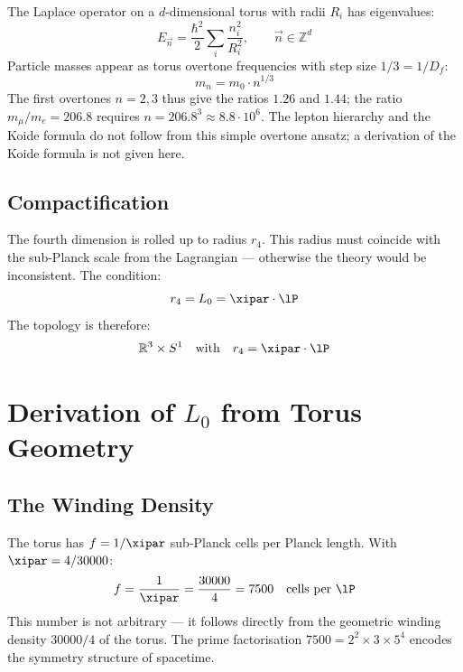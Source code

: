 The Laplace operator on a $d$-dimensional torus with radii $R_i$ has eigenvalues:
\begin{equation}
	E_{\vec{n}} = \frac{\hbar^2}{2} \sum_i \frac{n_i^2}{R_i^2}, \qquad \vec{n} \in \mathbb{Z}^d
\end{equation}
Particle masses appear as torus overtone frequencies with step size $1/3 = 1/D_f$:
\begin{equation}
	m_n = m_0 \cdot n^{1/3}
\end{equation}
The first overtones $n = 2, 3$ thus give the ratios $1.26$ and $1.44$; the ratio $m_\mu/m_e = 206.8$ requires $n = 206.8^3 \approx 8.8\cdot 10^6$. The lepton hierarchy and the Koide formula do not follow from this simple overtone ansatz; a derivation of the Koide formula is not given here.

\subsection{Compactification}

The fourth dimension is rolled up to radius $r_4$. This radius must coincide with the sub-Planck scale from the Lagrangian — otherwise the theory would be inconsistent. The condition:
\begin{equation}
	r_4 = L_0 = \xipar \cdot \lP
\end{equation}
The topology is therefore:
\begin{equation}
	\mathbb{R}^3 \times S^1 \quad \text{with} \quad r_4 = \xipar \cdot \lP
\end{equation}

\section{Derivation of \texorpdfstring{$L_0$}{L0} from Torus Geometry}

\subsection{The Winding Density}

The torus has $f = 1/\xipar$ sub-Planck cells per Planck length. With $\xipar = 4/30000$:
\begin{equation}
	f = \frac{1}{\xipar} = \frac{30000}{4} = 7500 \quad \text{cells per } \lP
\end{equation}
This number is not arbitrary — it follows directly from the geometric winding density $30000/4$ of the torus. The prime factorisation $7500 = 2^2 \times 3 \times 5^4$ encodes the symmetry structure of spacetime.

